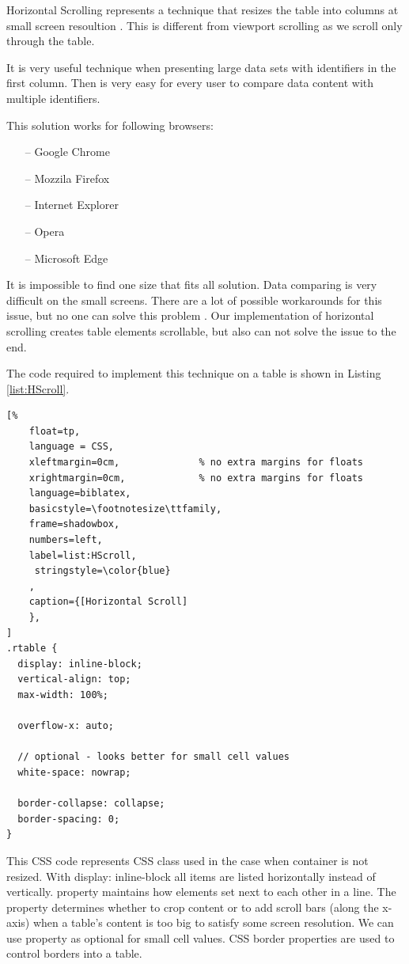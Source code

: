 Horizontal Scrolling represents a technique that resizes the table
into columns at small screen resoultion \parencite{HS_1}. 
This is different from viewport scrolling as we scroll only through 
the table.

It is very useful technique when presenting large data
 sets with identifiers in the first column. Then is very easy for 
 every user to compare data content with 
 multiple identifiers\parencite{HS}.

This solution works for following browsers:
\begin{itemize}
    \item[--] Google Chrome
    \item[--] Mozzila Firefox
    \item[--] Internet Explorer
    \item[--] Opera
    \item[--] Microsoft Edge
\end{itemize}

It is impossible to find one size that fits all solution. Data 
comparing is very difficult on the small screens.
There are a lot of possible workarounds for this issue, but no 
one can solve this problem \parencite{HS_1}.
Our implementation of horizontal scrolling creates table elements
 scrollable, but also can not solve the issue 
 to the end\parencite{HS_1}.

The code required to implement this technique 
on a table is shown in Listing \ref{list:HScroll}.

\begin{lstlisting}[%
    float=tp,
    language = CSS,
    xleftmargin=0cm,              % no extra margins for floats
    xrightmargin=0cm,             % no extra margins for floats
    language=biblatex,
    basicstyle=\footnotesize\ttfamily,
    frame=shadowbox,
    numbers=left,
    label=list:HScroll,
     stringstyle=\color{blue}
    ,
    caption={[Horizontal Scroll]
    },
]
.rtable {
  display: inline-block;
  vertical-align: top;
  max-width: 100%;

  overflow-x: auto;

  // optional - looks better for small cell values
  white-space: nowrap;

  border-collapse: collapse;
  border-spacing: 0;
}

\end{lstlisting}

This CSS code represents CSS class  used in the case
when container is not resized. With display: inline-block all items
are listed horizontally instead of vertically.  
property maintains how elements set next to each other in a line. The 
 property determines whether to crop content or
to add scroll bars (along the x-axis) when a table's content is too
big to satisfy some screen resolution. We can use  
property as optional for small cell values. CSS border properties are used 
to control borders into a table\parencite{HS_1}.

